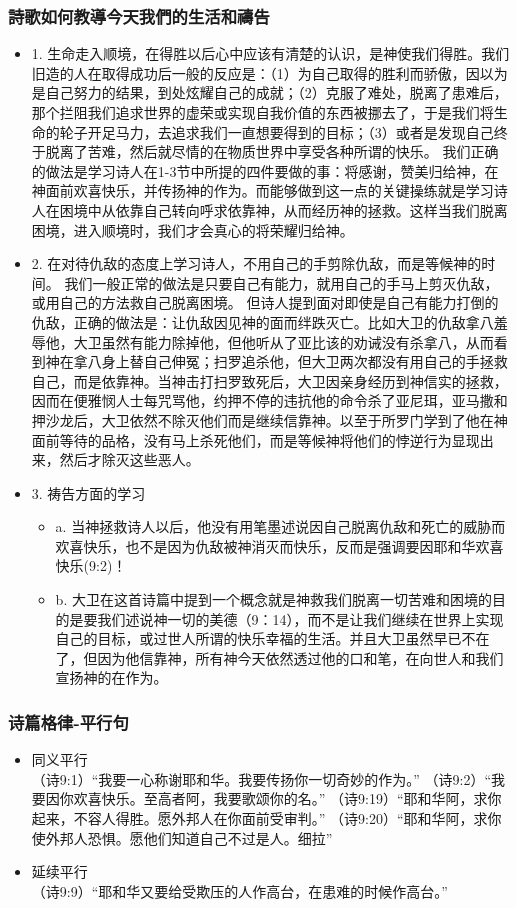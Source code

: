 \subsubsection{詩歌如何教導今天我們的生活和禱告}
\begin{itemize}
\itemsep-.45em  
\item 1.	生命走入顺境，在得胜以后心中应该有清楚的认识，是神使我们得胜。我们旧造的人在取得成功后一般的反应是：（1）为自己取得的胜利而骄傲，因以为是自己努力的结果，到处炫耀自己的成就；（2）克服了难处，脱离了患难后，那个拦阻我们追求世界的虚荣或实现自我价值的东西被挪去了，于是我们将生命的轮子开足马力，去追求我们一直想要得到的目标；（3）或者是发现自己终于脱离了苦难，然后就尽情的在物质世界中享受各种所谓的快乐。
我们正确的做法是学习诗人在1-3节中所提的四件要做的事：将感谢，赞美归给神，在神面前欢喜快乐，并传扬神的作为。而能够做到这一点的关键操练就是学习诗人在困境中从依靠自己转向呼求依靠神，从而经历神的拯救。这样当我们脱离困境，进入顺境时，我们才会真心的将荣耀归给神。
\item 2.	在对待仇敌的态度上学习诗人，不用自己的手剪除仇敌，而是等候神的时间。
我们一般正常的做法是只要自己有能力，就用自己的手马上剪灭仇敌，或用自己的方法救自己脱离困境。
但诗人提到面对即使是自己有能力打倒的仇敌，正确的做法是：让仇敌因见神的面而绊跌灭亡。比如大卫的仇敌拿八羞辱他，大卫虽然有能力除掉他，但他听从了亚比该的劝诫没有杀拿八，从而看到神在拿八身上替自己伸冤；扫罗追杀他，但大卫两次都没有用自己的手拯救自己，而是依靠神。当神击打扫罗致死后，大卫因亲身经历到神信实的拯救，因而在便雅悯人士每咒骂他，约押不停的违抗他的命令杀了亚尼珥，亚马撒和押沙龙后，大卫依然不除灭他们而是继续信靠神。以至于所罗门学到了他在神面前等待的品格，没有马上杀死他们，而是等候神将他们的悖逆行为显现出来，然后才除灭这些恶人。
\item 3.	祷告方面的学习
\begin{itemize}
\itemsep-.45em  
\item a.	当神拯救诗人以后，他没有用笔墨述说因自己脱离仇敌和死亡的威胁而欢喜快乐，也不是因为仇敌被神消灭而快乐，反而是强调要因耶和华欢喜快乐(9:2)！
\item b.	大卫在这首诗篇中提到一个概念就是神救我们脱离一切苦难和困境的目的是要我们述说神一切的美德（9：14），而不是让我们继续在世界上实现自己的目标，或过世人所谓的快乐幸福的生活。并且大卫虽然早已不在了，但因为他信靠神，所有神今天依然透过他的口和笔，在向世人和我们宣扬神的在作为。
\end{itemize}
\end{itemize}

\subsubsection{诗篇格律-平行句}
\begin{itemize}
\item  同义平行 \\
（诗9:1）“我要一心称谢耶和华。我要传扬你一切奇妙的作为。”
（诗9:2）“我要因你欢喜快乐。至高者阿，我要歌颂你的名。”
  （诗9:19）“耶和华阿，求你起来，不容人得胜。愿外邦人在你面前受审判。”
（诗9:20）“耶和华阿，求你使外邦人恐惧。愿他们知道自己不过是人。细拉”
\item  延续平行\\
 （诗9:9）“耶和华又要给受欺压的人作高台，在患难的时候作高台。”
\end{itemize}

